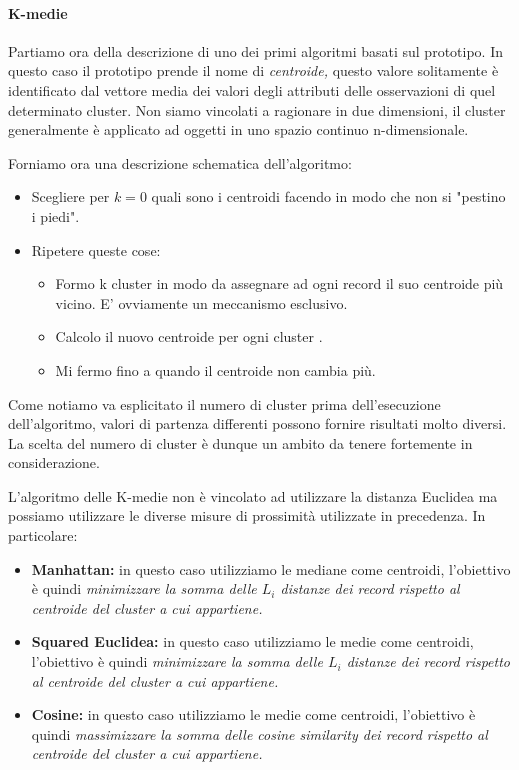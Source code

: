 \paragraph{K-medie}

Partiamo ora della descrizione di uno dei primi algoritmi basati sul prototipo. In questo caso il prototipo prende il nome di \textit{centroide,} questo valore solitamente è identificato dal vettore media dei valori degli attributi delle osservazioni di quel determinato cluster. Non siamo vincolati a ragionare in due dimensioni, il cluster generalmente è applicato ad oggetti in uno spazio continuo n-dimensionale.

Forniamo ora una descrizione schematica dell'algoritmo:
\begin{itemize}
	\item Scegliere per $k = 0$ quali sono i centroidi facendo in modo che non si "pestino i piedi".
	\item Ripetere queste cose:
	\begin{itemize}
		\item Formo k cluster in modo da assegnare ad ogni record il suo centroide più vicino. E' ovviamente un meccanismo esclusivo.
		\item Calcolo il nuovo centroide per ogni cluster .
		\item Mi fermo fino a quando il centroide non cambia più.		 
	\end{itemize}
	
	
\end{itemize}

Come notiamo va esplicitato il numero di cluster prima dell'esecuzione dell'algoritmo,  valori di partenza differenti possono fornire risultati molto diversi. La scelta del numero di cluster è dunque un ambito da tenere fortemente in considerazione.

L'algoritmo delle K-medie non è vincolato ad utilizzare la distanza Euclidea ma possiamo utilizzare le diverse misure di prossimità utilizzate in precedenza. In particolare:

\begin{itemize}
	\item \textbf{Manhattan:} in questo caso utilizziamo le mediane come centroidi, l'obiettivo è quindi \textit{minimizzare la somma delle $L_{i}$ distanze dei record rispetto al centroide del cluster a cui appartiene.}
	\item \textbf{Squared Euclidea:} in questo caso utilizziamo le medie come centroidi, l'obiettivo è quindi \textit{minimizzare la somma delle $L_{i}$ distanze dei record rispetto al centroide del cluster a cui appartiene.}
	\item \textbf{Cosine:} in questo caso utilizziamo le medie come centroidi, l'obiettivo è quindi \textit{massimizzare la somma delle cosine similarity dei record rispetto al centroide del cluster a cui appartiene.}
\end{itemize}


